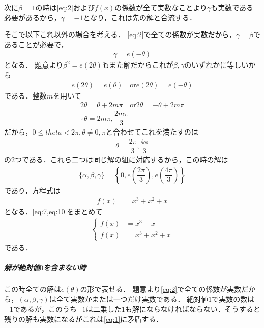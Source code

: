 \documentclass[../../main.tex]{subfiles}
\begin{document}
次に$\beta=1$の時は\cref{eq:2}および$f(x)$の係数が全て実数なことより$\gamma$も実数である必要があるから，$\gamma=-1$となり，これは先の解と合流する．

そこで以下これ以外の場合を考える．
\cref{eq:2}で全ての係数が実数だから，$\gamma=\bar{\beta}$であることが必要で，
\begin{align}
  \gamma = e\left(-\theta\right) \label{eq:8}
\end{align}
となる．
題意より$\beta^2=e(2\theta)$もまた解だからこれが$\beta,\gamma$のいずれかに等しいから
\begin{align}
  e(2\theta) = e(\theta) \quad \text{or} e(2\theta) = e(-\theta)
\end{align}
である．整数$m$を用いて
\begin{align}
  2\theta = \theta + 2m\pi \quad \text{or} 2\theta = -\theta + 2m\pi \\
  \therefore
  \theta = 2m\pi, \dfrac{2m\pi}{3}
\end{align}
だから，$0\le theta < 2\pi, \theta \neq 0,\pi$と合わせてこれを満たすのは
\begin{align}
  \theta = \dfrac{2\pi}{3}, \dfrac{4\pi}{3} \label{eq:9}
\end{align}
の$2$つである．これら二つは同じ解の組に対応するから，この時の解は
\begin{align}
  \{\alpha,\beta,\gamma\} = \left\{0,e\left(\dfrac{2\pi}{3}\right), e\left(\dfrac{4\pi}{3}\right)\right\}
\end{align}
であり，方程式は
\begin{align}
  f(x) &= x^3 + x^2 + x \label{eq:10}
\end{align}
となる．\cref{eq:7,eq:10}をまとめて
\begin{align}
  \begin{cases}
    f(x) &=  x^3 -x \\
    f(x) &= x^3 + x^2 + x
  \end{cases} \label{eq:11}
\end{align}
である．

\subparagraph{解が絶対値$0$を含まない時}

この時全ての解は$e(\theta)$の形で表せる．
題意より\cref{eq:2}で全ての係数が実数だから，$(\alpha,\beta,\gamma)$は全て実数かまたは一つだけ実数である．
絶対値$1$で実数の数は$\pm 1$であるが，このうち$-1$は二乗した$1$も解にならなければならない．そうすると残りの解も実数になるがこれは\cref{eq:1}に矛盾する．
\end{document}
